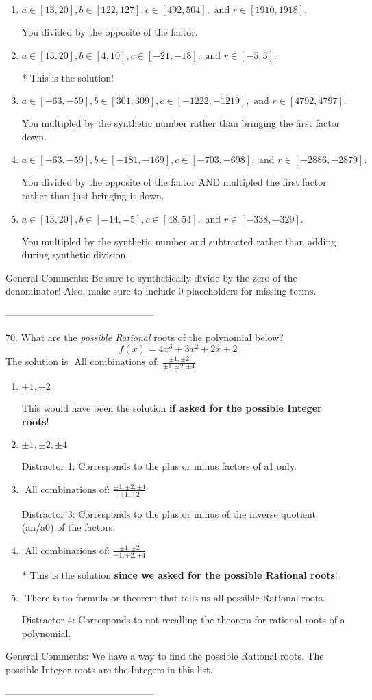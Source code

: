 \documentclass{extbook}[14pt]
\begin{document}
\begin{enumerate}[label=\Alph*.] 
\item $ a \in [13, 20], b \in [122, 127], c \in [492, 504], \text{ and } r \in [1910, 1918]. $ 

  You divided by the opposite of the factor. 
\item $ a \in [13, 20], b \in [4, 10], c \in [-21, -18], \text{ and } r \in [-5, 3]. $ 

 * This is the solution! 
\item $ a \in [-63, -59], b \in [301, 309], c \in [-1222, -1219], \text{ and } r \in [4792, 4797]. $ 

  You multipled by the synthetic number rather than bringing the first factor down. 
\item $ a \in [-63, -59], b \in [-181, -169], c \in [-703, -698], \text{ and } r \in [-2886, -2879]. $ 

  You divided by the opposite of the factor AND multipled the first factor rather than just bringing it down. 
\item $ a \in [13, 20], b \in [-14, -5], c \in [48, 54], \text{ and } r \in [-338, -329]. $ 

  You multipled by the synthetic number and subtracted rather than adding during synthetic division. 
\end{enumerate} 
 
General Comments: Be sure to synthetically divide by the zero of the denominator! Also, make sure to include 0 placeholders for missing terms.

-----------------------------------------------

70. What are the \textit{possible Rational} roots of the polynomial below?
\[ f(x) = 4x^{3} +3 x^{2} +2 x + 2 \] 
The solution is $ \text{ All combinations of: }\frac{\pm 1,\pm 2}{\pm 1,\pm 2,\pm 4} $ 

\begin{enumerate}[label=\Alph*.] 
\item $ \pm 1,\pm 2 $ 

 This would have been the solution \textbf{if asked for the possible Integer roots}! 
\item $ \pm 1,\pm 2,\pm 4 $ 

  Distractor 1: Corresponds to the plus or minus factors of a1 only. 
\item $ \text{ All combinations of: }\frac{\pm 1,\pm 2,\pm 4}{\pm 1,\pm 2} $ 

  Distractor 3: Corresponds to the plus or minus of the inverse quotient (an/a0) of the factors.  
\item $ \text{ All combinations of: }\frac{\pm 1,\pm 2}{\pm 1,\pm 2,\pm 4} $ 

 * This is the solution \textbf{since we asked for the possible Rational roots}! 
\item $ \text{ There is no formula or theorem that tells us all possible Rational roots.} $ 

  Distractor 4: Corresponds to not recalling the theorem for rational roots of a polynomial. 
\end{enumerate} 
 
General Comments: We have a way to find the possible Rational roots. The possible Integer roots are the Integers in this list.

-----------------------------------------------
\end{document}
